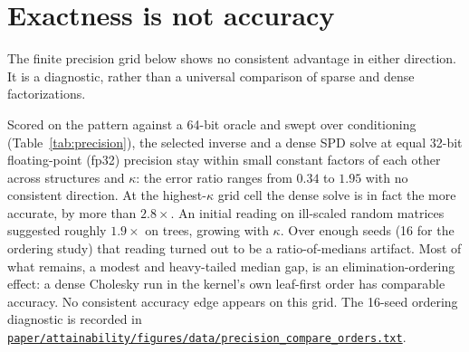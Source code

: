\section{Exactness is not accuracy}
\label{sec:numerics}

The finite precision grid below shows no consistent advantage in either
direction.
It is a diagnostic, rather than a universal comparison of sparse and dense
factorizations.

Scored on the pattern against a 64-bit oracle and swept over conditioning
(Table~\ref{tab:precision}), the selected inverse and a dense SPD solve at
equal 32-bit floating-point (fp32) precision stay within small constant
factors of each other across
structures and $\kappa$: the error ratio ranges from $0.34$ to $1.95$ with no
consistent direction. At the highest-$\kappa$ grid cell the dense solve is in fact
the more accurate, by more than $2.8\times$. An initial reading on ill-scaled random matrices suggested roughly
$1.9\times$ on trees, growing with $\kappa$. Over enough seeds (16 for the
ordering study) that reading turned out to be a ratio-of-medians artifact. Most
of what remains, a modest and heavy-tailed median gap, is an
elimination-ordering effect: a dense Cholesky run in the kernel's own
leaf-first order has comparable accuracy. No consistent accuracy edge appears
on this grid. The 16-seed ordering diagnostic is recorded in
\href{https://github.com/vanshsehrawat14/gabp-sparse-inv/blob/main/paper/attainability/figures/data/precision_compare_orders.txt}
{\nolinkurl{paper/attainability/figures/data/precision_compare_orders.txt}}.

